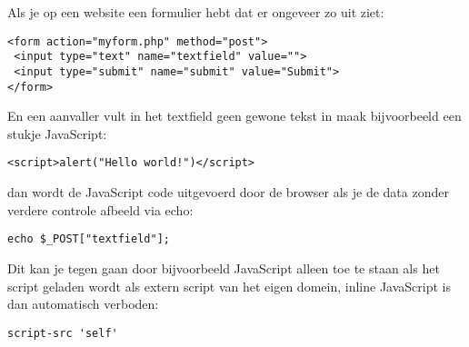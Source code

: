 Als je op een website een formulier hebt dat er ongeveer zo uit ziet:
\begin{lstlisting}
<form action="myform.php" method="post">
 <input type="text" name="textfield" value="">
 <input type="submit" name="submit" value="Submit">
</form>
\end{lstlisting}

En een aanvaller vult in het textfield geen gewone tekst in maak bijvoorbeeld een stukje JavaScript:
\begin{lstlisting}
<script>alert("Hello world!")</script>
\end{lstlisting}

dan wordt de JavaScript code uitgevoerd door de browser als je de data zonder verdere controle afbeeld via echo:
\begin{lstlisting}
echo $_POST["textfield"];
\end{lstlisting}

Dit kan je tegen gaan door bijvoorbeeld JavaScript alleen toe te staan als het script geladen wordt als extern script van het eigen domein, inline JavaScript is dan automatisch verboden:
\begin{lstlisting}
script-src 'self'
\end{lstlisting}
